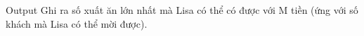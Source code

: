 Output
Ghi ra số xuất ăn lớn nhất mà Lisa có thể có được với M tiền (ứng với số khách mà Lisa có thể mời được).
